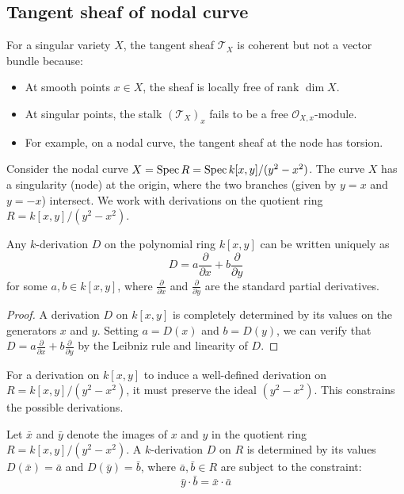 \documentclass[12pt]{article}
\begin{document}
\subsection{Tangent sheaf of nodal curve}

\begin{example}
    For a singular variety $X$, the tangent sheaf $\mathcal{T}_X$ is coherent but not a vector bundle because:
    \begin{itemize}
        \item At smooth points $x \in X$, the sheaf is locally free of rank $\dim X$.
        \item At singular points, the stalk $(\mathcal{T}_X)_x$ fails to be a free $\mathcal{O}_{X,x}$-module.
        \item For example, on a nodal curve, the tangent sheaf at the node has torsion.
    \end{itemize}
\end{example}
Consider the nodal curve $X = \operatorname{Spec} R = \operatorname{Spec} k[x,y]/(y^2-x^2)$. The curve $X$ has a singularity (node) at the origin, where the two branches (given by $y = x$ and $y = -x$) intersect. We work with derivations on the quotient ring $R = k[x,y]/(y^2-x^2)$.

\begin{lemma}
Any $k$-derivation $D$ on the polynomial ring $k[x,y]$ can be written uniquely as
\begin{equation}
D = a\frac{\partial}{\partial x} + b\frac{\partial}{\partial y}
\end{equation}
for some $a,b \in k[x,y]$, where $\frac{\partial}{\partial x}$ and $\frac{\partial}{\partial y}$ are the standard partial derivatives.
\end{lemma}

\begin{proof}
A derivation $D$ on $k[x,y]$ is completely determined by its values on the generators $x$ and $y$. Setting $a = D(x)$ and $b = D(y)$, we can verify that $D = a\frac{\partial}{\partial x} + b\frac{\partial}{\partial y}$ by the Leibniz rule and linearity of $D$.
\end{proof}

For a derivation on $k[x,y]$ to induce a well-defined derivation on $R = k[x,y]/(y^2-x^2)$, it must preserve the ideal $(y^2-x^2)$. This constrains the possible derivations.

\begin{proposition}
Let $\bar{x}$ and $\bar{y}$ denote the images of $x$ and $y$ in the quotient ring $R = k[x,y]/(y^2-x^2)$. A $k$-derivation $D$ on $R$ is determined by its values $D(\bar{x}) = \bar{a}$ and $D(\bar{y}) = \bar{b}$, where $\bar{a}, \bar{b} \in R$ are subject to the constraint:
\begin{equation}
\bar{y} \cdot \bar{b} = \bar{x} \cdot \bar{a}
\end{equation}
\end{proposition}
\end{document}
